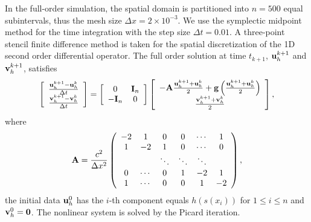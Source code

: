 \documentclass[11pt]{article}
\begin{document}
In the full-order simulation, the spatial domain is partitioned into $n=500$ equal subintervals, thus the mesh size $\Delta x= 2\times 10^{-3}$.
We use the symplectic midpoint method for the time integration with the step size $\Delta t= 0.01$.
A three-point stencil finite difference method is taken for the spatial discretization of the 1D second order differential operator.
The full order solution at time $t_{k+1}$, ${\bf u}_h^{k+1}$ and ${\bf v}_h^{k+1}$, satisfies
\begin{equation*}
\left[
\begin{array}{c}
\frac{{\bf u}_h^{k+1}-{\bf u}_h^k}{\Delta t}\\
\frac{{\bf v}_h^{k+1}-{\bf v}_h^k}{\Delta t}
\end{array}
\right] =
\left[
\begin{array}{cc}
0 &{\bf I}_n \\
-{\bf I}_n & 0
\end{array}
\right]
\left[
\begin{array}{c}
-{\bf A}\frac{{\bf u}_h^{k+1}+{\bf u}_h^k}{2} + {\bf g}\left(\frac{{\bf u}_h^{k+1}+{\bf u}_h^k}{2}\right)\\
\frac{{\bf v}_h^{k+1}+{\bf v}_h^k}{2}
\end{array}
\right],
\end{equation*}
where
\begin{equation*}
{\bf A}= \frac{c^2}{\Delta x^2}
\left( \begin{array}{cccccc}
-2 & 1 & 0  & 0 & \cdots & 1 \\
1 & -2 & 1 & 0 & \cdots & 0 \\
   &     & \ddots & \ddots & \ddots &  \\
 0   &    \cdots&0          &  1 & -2  & 1 \\
 1 &    \cdots      &0     &  0  &  1 & -2
\end{array} \right),
\end{equation*}
the initial data ${\bf u}_h^0$ has the $i$-th component equals $h(s(x_i))$ for $1\leq i\leq n$ and ${\bf v}_h^0= {\bf 0}$.
The nonlinear system is solved by the Picard iteration.  
%
\end{document}
